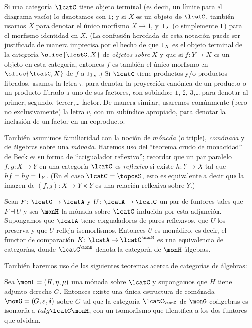Si una categoría \(\lcatC\) tiene objeto terminal (es decir, un límite para el
diagrama vacío) lo denotamos con \(1\); y si \(X\) es un objeto de \(\lcatC\),
también usamos \(X\) para denotar el único morfismo \(X\to 1\), y \(1_X\) (o
simplemente \(1\)) para el morfismo identidad en \(X\). (La confusión heredada
de esta notación puede ser justificada de manera imprecisa por el hecho de que
\(1_X\) es el objeto terminal de la categoría \(\slice{\lcatC,X}\) de
\emph{objetos sobre} \(X\) y que si \(f\colon Y \to X\) es un objeto en esta
categoría, entonces \(f\) es también el único morfismo en \(\slice{\lcatC,X}\)
de \(f\) a \(1_{1_X}\).) Si \(\lcatC\) tiene productos y/o productos fibrados,
usamos la letra \(\pi\) para denotar la proyección canónica de un producto o un
producto fibrado a uno de sus factores, con subíndice \(1\), \(2\),
\(3\),{\ldots} para denotar al primer, segundo, tercer,{\dots} factor. De manera
similar, usaremos comúnmente (pero no exclusivamente) la letra \(v\), con un
subíndice apropiado, para denotar la inclusión de un factor en un coproducto.

También asumimos familiaridad con la noción de \emph{mónada} (o triple),
\emph{comónada} y de álgebras sobre una \emph{mónada}. Haremos uso del
\enquote{teorema crudo de monacidad} de Beck \pend{[153]} es su forma de
\enquote{coigualador reflexivo}; recordar que un par paralelo 
\(f,g\colon X\to Y\) en una categoría \(\lcatC\) es \emph{reflexivo} si existe
\(h\colon Y\to X\) tal que \(hf = hg = 1_Y\). (En el caso \(\lcatC=\con\), esto
es equivalente a decir que la imagen de \((f,g)\colon X\to Y\times Y\) es una
relación reflexiva sobre \(Y\).)

\begin{theorem}[label=0.13]
  Sean \(F\colon\lcatC\to\lcatA\) y \(U\colon\lcatA\to\lcatC\) un par de
  funtores tales que \(F\dashv U\) y sea \(\monH\) la mónada sobre \(\lcatC\)
  inducida por esta adjunción. Supongamos que \(\lcatA\) tiene coigualadores de
  pares reflexivos, que \(U\) los preserva y que \(U\) refleja isomorfismos.
  Entonces \(U\) es monádico, es decir, el functor de comparación 
  \(K\colon\lcatA\to\talg{\lcatC}{\monH}\) es una equivalencia de categorías,
  donde \(\talg{\lcatC}{\monH}\) denota la categoría de \(\monH\)-álgebras.
\end{theorem}

También haremos uso de los siguientes teoremas acerca de categorías de álgebras:

\begin{theorem}[label=0.14,note={Eilenberg-Moore \pend{[162]}},
  short-note={Eilenberg-Moore}]
  Sea \(\monH=(H,\eta,\mu)\) una mónada sobre \(\lcatC\) y supongamos que \(H\)
  tiene adjunto derecho \(G\). Entonces existe una única estructura de comónada
  \(\monG=(G,\varepsilon,\delta)\) sobre \(G\) tal que la categoría 
  \(\coalg{\lcatC}{\monG}\) de \(\monG\)-coálgebras es isomorfa a
  \(talg{\lcatC}{\monH}\), con un isomorfismo que identifica a los dos funtores
  que olvidan.  
\end{theorem}

